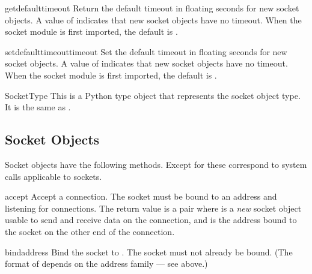 \begin{funcdesc}{getdefaulttimeout}{}
Return the default timeout in floating seconds for new socket objects.
A value of  indicates that new socket objects have no timeout.
When the socket module is first imported, the default is .
\end{funcdesc}

\begin{funcdesc}{setdefaulttimeout}{timeout}
Set the default timeout in floating seconds for new socket objects.
A value of  indicates that new socket objects have no timeout.
When the socket module is first imported, the default is .
\end{funcdesc}

\begin{datadesc}{SocketType}
This is a Python type object that represents the socket object type.
It is the same as .
\end{datadesc}


\begin{seealso}
\end{seealso}


\subsection{Socket Objects \label{socket-objects}}

Socket objects have the following methods.  Except for
 these correspond to \UNIX{} system calls
applicable to sockets.

\begin{methoddesc}[socket]{accept}{}
Accept a connection.
The socket must be bound to an address and listening for connections.
The return value is a pair 
where  is a \emph{new} socket object usable to send and
receive data on the connection, and  is the address bound
to the socket on the other end of the connection.
\end{methoddesc}

\begin{methoddesc}[socket]{bind}{address}
Bind the socket to .  The socket must not already be bound.
(The format of  depends on the address family --- see
above.)  
\end{methoddesc}

